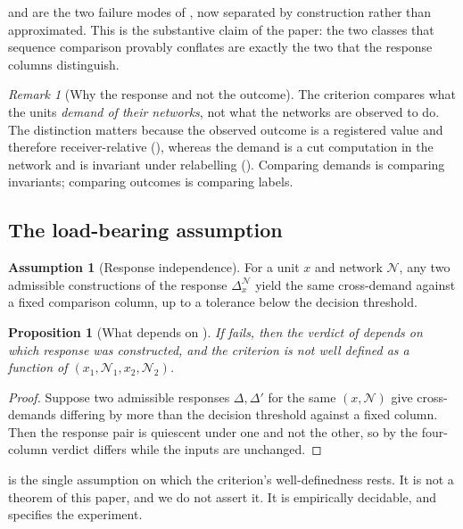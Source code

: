 \documentclass[11pt,twocolumn,a4paper]{article}
\newtheorem{proposition}[theorem]{Proposition}
\theoremstyle{definition}
\newtheorem{assumption}[theorem]{Assumption}
\theoremstyle{remark}
\newtheorem{remark}[theorem]{Remark}
\newcommand{\netw}{\mathcal{N}}
\newcommand{\Perturb}{\Delta}
\begin{document}
 and  are the two failure modes
of , now separated by construction rather than
approximated. This is the substantive claim of the paper: the two classes
that sequence comparison provably conflates are exactly the two that the
response columns distinguish.

\begin{remark}[Why the response and not the outcome]
\label{rem:route}
The criterion compares what the units \emph{demand of their networks}, not
what the networks are observed to do. The distinction matters because the
observed outcome is a registered value and therefore receiver-relative
(), whereas the demand is a cut computation in the
network and is invariant under relabelling
(). Comparing demands is comparing invariants;
comparing outcomes is comparing labels.
\end{remark}

\subsection{The load-bearing assumption}

\begin{assumption}[Response independence]
\label{ass:respind}
For a unit $x$ and network $\netw$, any two admissible constructions of
the response $\Perturb^{\netw}_x$ yield the same cross-demand against a
fixed comparison column, up to a tolerance below the decision threshold.
\end{assumption}

\begin{proposition}[What depends on ]
\label{prop:respind}
If  fails, then the verdict of  depends
on which response was constructed, and the criterion is not well defined
as a function of $(x_1,\netw_1,x_2,\netw_2)$.
\end{proposition}

\begin{proof}
Suppose two admissible responses $\Perturb,\Perturb'$ for the same
$(x,\netw)$ give cross-demands differing by more than the decision
threshold against a fixed column. Then the response pair is quiescent
under one and not the other, so by  the four-column
verdict differs while the inputs are unchanged.
\end{proof}

 is the single assumption on which the criterion's
well-definedness rests. It is not a theorem of this paper, and we do not
assert it. It is empirically decidable, and 
specifies the experiment.
\end{document}
